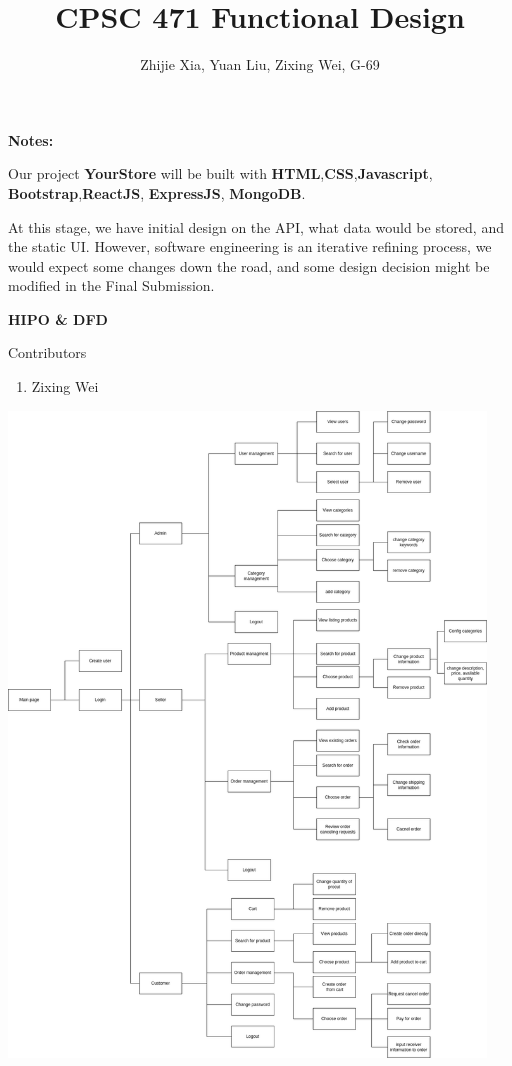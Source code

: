\documentclass[12pt]{article}
\author{Zhijie Xia, Yuan Liu, Zixing Wei, G-69}
\title{CPSC 471 Functional Design}
\begin{document}
\maketitle

\newpage
\textbf{Notes:\\}

Our project \textbf{YourStore} will be built with \textbf{HTML},\textbf{CSS},\textbf{Javascript}, \textbf{Bootstrap},\textbf{ReactJS},
\textbf{ExpressJS}, \textbf{MongoDB}.



At this stage, we have initial design on the API, what data would be stored, and the static UI. However, software engineering is an iterative refining process,
we would expect some changes down the road, and some design decision might be modified in the Final Submission.



\newpage

\textbf{HIPO \& DFD}

Contributors
\begin{enumerate}
    \item Zixing Wei
\end{enumerate}

\includegraphics[width=0.95\textwidth]{HIPO/HIPO.drawio.png}
\end{document}
